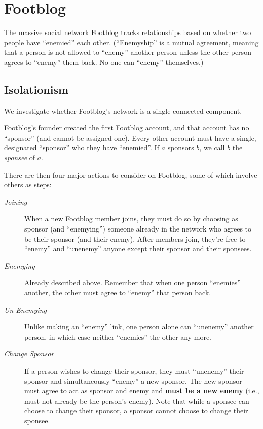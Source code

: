 \documentclass[11pt, oneside]{article}   	%
\theoremstyle{definition}
\theoremstyle{remark}
\begin{document}
\section{Footblog}

The massive social network Footblog tracks relationships based on
whether two people have ``enemied'' each other. (``Enemyship'' is a mutual
agreement, meaning that a person is not allowed to ``enemy'' another
person unless the other person agrees to ``enemy'' them back. No one can
``enemy'' themselves.)
\subsection{Isolationism}

We investigate whether Footblog's network is a single connected
component.

Footblog's founder created the first Footblog account, and that
account has no ``sponsor'' (and cannot be assigned one). Every other
account must have a single, designated ``sponsor'' who they have
``enemied''. If $a$ sponsors $b$, we call $b$ the \emph{sponsee} of $a$.

There are then four major actions to consider on Footblog, some of
which involve others as steps:
\begin{description}
\item[\emph{Joining}] When a new Footblog member joins, they must do so by
               choosing as sponsor (and ``enemying'') someone already in
               the network who agrees to be their sponsor (and their
               enemy). After members join, they're free to ``enemy''
               and ``unenemy'' anyone except their sponsor and their
               sponsees.
\item[\emph{Enemying}] Already described above. Remember that when one person
                ``enemies'' another, the other must agree to ``enemy''
                that person back.
\item[\emph{Un-Enemying}] Unlike making an ``enemy'' link, one person alone can
                   ``unenemy'' another person, in which case neither
                   ``enemies'' the other any more.
\item[\emph{Change Sponsor}] If a person wishes to change their sponsor, they
     must ``unenemy'' their sponsor and simultaneously ``enemy'' a new
     sponsor. The new sponsor must agree to act as sponsor and enemy
     and \textbf{must be a new enemy} (i.e., must not already be the person's
     enemy). Note that while a sponsee can choose to change their
     sponsor, a sponsor cannot choose to change their sponsee.
\end{description}
\end{document}

